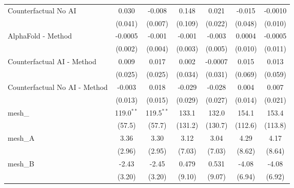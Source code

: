 \begin{tabular}{lcccccc}
   Counterfactual No AI                                        & 0.030         & -0.008        & 0.148         & 0.021         & -0.015         & -0.0010\\   
                                                               & (0.041)       & (0.007)       & (0.109)       & (0.022)       & (0.048)        & (0.010)\\   
   AlphaFold - Method                                          & -0.0005       & -0.001        & -0.001        & -0.003        & 0.0004         & -0.0005\\   
                                                               & (0.002)       & (0.004)       & (0.003)       & (0.005)       & (0.010)        & (0.011)\\   
   Counterfactual AI - Method                                  & 0.009         & 0.017         & 0.002         & -0.0007       & 0.015          & 0.013\\   
                                                               & (0.025)       & (0.025)       & (0.034)       & (0.031)       & (0.069)        & (0.059)\\   
   Counterfactual No AI - Method                               & -0.003        & 0.018         & -0.029        & -0.028        & 0.004          & 0.007\\   
                                                               & (0.013)       & (0.015)       & (0.029)       & (0.027)       & (0.014)        & (0.021)\\   
   mesh\_                                                      & 119.0$^{**}$  & 119.5$^{**}$  & 133.1         & 132.0         & 154.1          & 153.4\\   
                                                               & (57.5)        & (57.7)        & (131.2)       & (130.7)       & (112.6)        & (113.8)\\   
   mesh\_A                                                     & 3.36          & 3.30          & 3.12          & 3.04          & 4.29           & 4.17\\   
                                                               & (2.96)        & (2.95)        & (7.03)        & (7.03)        & (8.62)         & (8.64)\\   
   mesh\_B                                                     & -2.43         & -2.45         & 0.479         & 0.531         & -4.08          & -4.08\\   
                                                               & (3.20)        & (3.20)        & (9.10)        & (9.07)        & (6.94)         & (6.92)\\   

\end{tabular}
